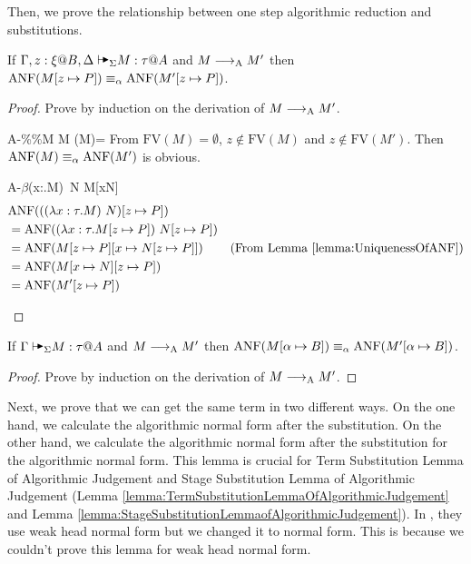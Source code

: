 Then, we prove the relationship between one step algorithmic reduction and substitutions.

\begin{lemma}
    \label{lemma:AlgorithmicReductionAndTermSubstitution}
    If \( \G, z:\xi@B, \D \AVS M : \tau @ A \) and \( M \longrightarrow_{\text{A}} M' \) then
    \( \text{ANF}(M[z\mapsto P]) \equiv_\alpha \text{ANF}(M'[z\mapsto P]) \).
\end{lemma}

\begin{proof}
    Prove by induction on the derivation of \( M \longrightarrow_{\text{A}} M' \).
    \begin{rneqncase}{\textsc{A-\%}}{\%M \RA M  (M)=\emptyset}
        From \( \text{FV}(M)=\emptyset \), \( z \notin \text{FV}(M) \) and \( z \notin \text{FV}(M') \).
        Then \( \text{ANF}(M) \equiv_\alpha \text{ANF}(M') \) is obvious.
    \end{rneqncase}

    \begin{rneqncase}{\textsc{A-$\beta$}}{(\lambda x:\tau.M)\ N \RA M[x\mapsto N]}
        \begin{align*}
            & \text{ANF}(((\lambda x:\tau.M)\ N)[z \mapsto P]) \\
            & = \text{ANF}((\lambda x:\tau.M[z \mapsto P])\ N[z \mapsto P]) \\
            & = \text{ANF}(M[z \mapsto P][x \mapsto N[z \mapsto P]]) & (\text{From Lemma } \ref{lemma:UniquenessOfANF}) \\
            & = \text{ANF}(M[x \mapsto N][z \mapsto P]) \\
            & = \text{ANF}(M'[z \mapsto P])
        \end{align*}
    \end{rneqncase}
\end{proof}

\begin{lemma}
    \label{lemma:AlgorithmicReductionAndStageSubstitution}
    If \( \G \AVS M : \tau @ A \) and \( M \longrightarrow_{\text{A}} M' \) then
    \( \text{ANF}(M[\alpha \mapsto B]) \equiv_\alpha \text{ANF}(M'[\alpha \mapsto B]) \).
\end{lemma}

\begin{proof}
    Prove by induction on the derivation of \( M \longrightarrow_{\text{A}} M' \).
\end{proof}

Next, we prove that we can get the same term in two different ways. On the one
hand, we calculate the algorithmic normal form after the substitution. On the
other hand, we calculate the algorithmic normal form after the substitution for
the algorithmic normal form. This lemma is crucial for Term Substitution Lemma
of Algorithmic Judgement and Stage Substitution Lemma of Algorithmic
Judgement (Lemma \ref{lemma:TermSubstitutionLemmaOfAlgorithmicJudgement} and
Lemma \ref{lemma:StageSubstitutionLemmaofAlgorithmicJudgement}). In
\cite{attapl}, they use weak head normal form but we changed it to normal form.
This is because we couldn't prove this lemma for weak head normal form.

